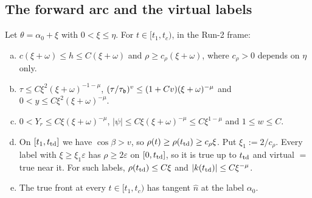 \subsection{The forward arc and the virtual labels}\label{app:B-forward}

\begin{lemma}\label{lem:B-forward}
Let $\theta=\alpha_0+\xi$ with $0<\xi\le\eta$. For $t\in[t_1,t_c)$, in the Run-2 frame:
\begin{enumerate}[(a)]\setlength{\itemsep}{1pt}
\item $c(\xi+\omega)\le h\le C(\xi+\omega)$ and $\rho\ge c_\rho(\xi+\omega)$, where $c_\rho>0$ depends on $\eta$ only.
\item $\tau\le C\xi^2(\xi+\omega)^{-1-\mu}$, $(\tau/\tau_{\mathfrak{b}})^v\le(1+Cv)(\xi+\omega)^{-\mu}$ and $0<y\le C\xi^2(\xi+\omega)^{-\mu}$.
\item $0<Y_r\le C\xi(\xi+\omega)^{-\mu}$, $|\psi|\le C\xi(\xi+\omega)^{-\mu}\le C\xi^{1-\mu}$ and $1\le w\le C$.
\item On $[t_1,t_{\mathrm{td}}]$ we have $\cos\beta>v$, so $\rho(t)\ge\rho(t_{\mathrm{td}})\ge c_\rho\xi$. Put $\xi_1:=2/c_\rho$. Every label with
$\xi\ge\xi_1\varepsilon$ has $\rho\ge2\varepsilon$ on $[0,t_{\mathrm{td}}]$, so it is true up to $t_{\mathrm{td}}$ and virtual $=$ true near it. For such
labels, $\rho(t_{\mathrm{td}})\le C\xi$ and $|k(t_{\mathrm{td}})|\le C\xi^{-\mu}$.
\item The true front at every $t\in[t_1,t_c)$ has tangent $\hat n$ at the label $\alpha_0$.
\end{enumerate}
\end{lemma}
